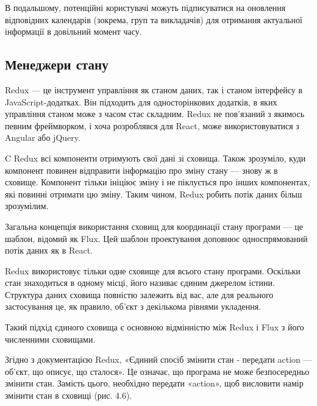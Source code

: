 В подальшому, потенційні користувачі можуть підписуватися на оновлення відповідних календарів (зокрема, груп та викладачів) для отримання актуальної інформації в довільний момент часу.

\subsection{Менеджери стану}

Redux — це інструмент управління як станом даних, так і станом інтерфейсу в JavaScript-додатках. Він підходить для односторінкових додатків, в яких управління станом може з часом стає складним. Redux не пов'язаний з якимось певним фреймворком, і хоча розроблявся для React, може використовуватися з Angular або jQuery.

C Redux всі компоненти отримують свої дані зі сховища. Також зрозуміло, куди компонент повинен відправити інформацію про зміну стану — знову ж в сховище. Компонент тільки ініціює зміну і не піклується про інших компонентах, які повинні отримати цю зміну. Таким чином, Redux робить потік даних більш зрозумілим.

Загальна концепція використання сховищ для координації стану програми — це шаблон, відомий як Flux. Цей шаблон проектування доповнює односпрямований потік даних як в React.

Redux використовує тільки одне сховище для всього стану програми. Оскільки стан знаходиться в одному місці, його називає єдиним джерелом істини. Структура даних сховища повністю залежить від вас, але для реального застосування це, як правило, об'єкт з декількома рівнями укладення.

Такий підхід єдиного сховища є основною відмінністю між Redux і Flux з його численними сховищами.

Згідно з документацією Redux, «Єдиний спосіб змінити стан - передати action — об'єкт, що описує, що сталося». Це означає, що програма не може безпосередньо змінити стан. Замість цього, необхідно передати «action», щоб висловити намір змінити стан в сховищі (рис. 4.6).
